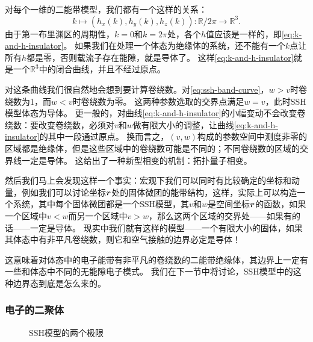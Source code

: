 对每个一维的二能带模型，我们都有一个这样的关系：
\begin{equation}
    k \mapsto (h_x(k), h_y(k), h_z(k)) : \mathbb{R} / 2 \pi \to \mathbb{R}^3.
    \label{eq:k-and-h-insulator}
\end{equation}
由于第一布里渊区的周期性，$k = 0$和$k = 2\pi$处，各个$h$值应该是一样的，即\eqref{eq:k-and-h-insulator}。
如果我们在处理一个体态为绝缘体的系统，还不能有一个$k$点让所有$h$都是零，否则载流子存在能隙，就是导体了。
这样\eqref{eq:k-and-h-insulator}就是一个$\mathbb{R}^3$中的闭合曲线，并且不经过原点。

对这条曲线我们很自然地会想到要计算卷绕数。对\eqref{eq:ssh-band-curve}，$w > v$时卷绕数为1，而$w < v$时卷绕数为零。
这两种参数选取的交界点满足$w = v$，此时SSH模型体态为导体。
更一般的，对曲线\eqref{eq:k-and-h-insulator}的小幅变动不会改变卷绕数：要改变卷绕数，必须对$v$和$w$做有限大小的调整，让曲线\eqref{eq:k-and-h-insulator}的其中一段通过原点。
换而言之，$(v, w)$构成的参数空间中测度非零的区域都是绝缘体，但是这些区域中的卷绕数可能是不同的；不同卷绕数的区域的交界线一定是导体。
这给出了一种新型相变的机制：拓扑量子相变。

然后我们马上会发现这样一个事实：宏观下我们可以同时有比较确定的坐标和动量，例如我们可以讨论坐标$\vb*{r}$处的固体微团的能带结构，这样，实际上可以构造一个系统，其中每个固体微团都是一个SSH模型，其$v$和$w$是空间坐标$\vb*{r}$的函数，如果一个区域中$v < w$而另一个区域中$v > w$，那么这两个区域的交界处——如果有的话——一定是导体。
现实中我们就有这样的模型——一个有限大小的固体，如果其体态中有非平凡卷绕数，则它和空气接触的边界必定是导体！

这意味着对体态中的电子能带有非平凡的卷绕数的二能带绝缘体，其边界上一定有一些和体态中不同的无能隙电子模式。
我们在下一节中将讨论，SSH模型中的这种边界态到底是怎么来的。

\subsubsection{电子的二聚体}

\begin{figure}
    \centering
    \subfigure[$v=1, w= 0$，没有边界态]{
         
        \label{fig:ssh-model-trivial-limit}  
    }
    \subfigure[$w = 1, v = 0$，有边界态]{
        
        \label{fig:ssh-model-topological-limit}
    }
    \caption{SSH模型的两个极限}
\end{figure}


